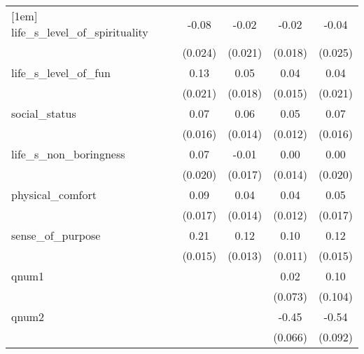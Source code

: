 {\begin{tabular}{l*{5}{c}}
[1em]
life\_s\_level\_of\_spirituality&                     &       -0.08\sym{***}&       -0.02         &       -0.02         &       -0.04         \\
            &                     &     (0.024)         &     (0.021)         &     (0.018)         &     (0.025)         \\
[1em]
life\_s\_level\_of\_fun&                     &        0.13\sym{***}&        0.05\sym{*}  &        0.04\sym{*}  &        0.04\sym{*}  \\
            &                     &     (0.021)         &     (0.018)         &     (0.015)         &     (0.021)         \\
[1em]
social\_status&                     &        0.07\sym{***}&        0.06\sym{***}&        0.05\sym{***}&        0.07\sym{***}\\
            &                     &     (0.016)         &     (0.014)         &     (0.012)         &     (0.016)         \\
[1em]
life\_s\_non\_boringness&                     &        0.07\sym{***}&       -0.01         &        0.00         &        0.00         \\
            &                     &     (0.020)         &     (0.017)         &     (0.014)         &     (0.020)         \\
[1em]
physical\_comfort&                     &        0.09\sym{***}&        0.04\sym{**} &        0.04\sym{**} &        0.05\sym{**} \\
            &                     &     (0.017)         &     (0.014)         &     (0.012)         &     (0.017)         \\
[1em]
sense\_of\_purpose&                     &        0.21\sym{***}&        0.12\sym{***}&        0.10\sym{***}&        0.12\sym{***}\\
            &                     &     (0.015)         &     (0.013)         &     (0.011)         &     (0.015)         \\
[1em]
qnum1       &                     &                     &                     &        0.02         &        0.10         \\
            &                     &                     &                     &     (0.073)         &     (0.104)         \\
[1em]
qnum2       &                     &                     &                     &       -0.45\sym{***}&       -0.54\sym{***}\\
            &                     &                     &                     &     (0.066)         &     (0.092)         \\

\end{tabular}}
